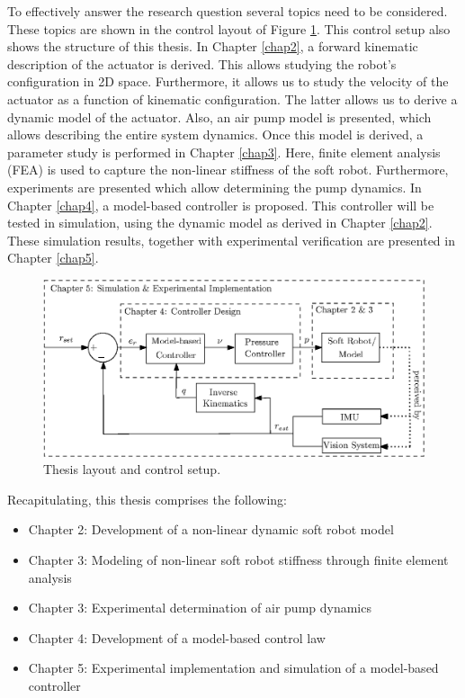 To effectively answer the research question several topics need to be considered. These topics are shown in the control layout of Figure \ref{fig1:controlarchitecture}. This control setup also shows the structure of this thesis. In Chapter \ref{chap2}, a forward kinematic description of the actuator is derived. This allows studying the robot's configuration in 2D space. Furthermore, it allows us to study the velocity of the actuator as a function of kinematic configuration. The latter allows us to derive a dynamic model of the actuator. Also, an air pump model is presented, which allows describing the entire system dynamics. Once this model is derived, a parameter study is performed in Chapter \ref{chap3}. Here, finite element analysis (FEA) is used to capture the non-linear stiffness of the soft robot. Furthermore, experiments are presented which allow determining the pump dynamics. In Chapter \ref{chap4}, a model-based controller is proposed. This controller will be tested in simulation, using the dynamic model as derived in Chapter \ref{chap2}. These simulation results, together with experimental verification are presented in Chapter \ref{chap5}.




\begin{figure}[H]
    \centering
    \includegraphics[width = \textwidth]{Figures/Chapter1/controlschemeCompleteGood.eps}
    \caption{Thesis layout and control setup.}
    \label{fig1:controlarchitecture}
\end{figure}


Recapitulating, this thesis comprises the following:


\begin{itemize}
    \item Chapter 2: Development of a non-linear dynamic soft robot model
    \item Chapter 3: Modeling of non-linear soft robot stiffness through finite element analysis
    \item Chapter 3: Experimental determination of air pump dynamics
    \item Chapter 4: Development of a model-based control law
    \item Chapter 5: Experimental implementation and simulation of a model-based controller
\end{itemize}


